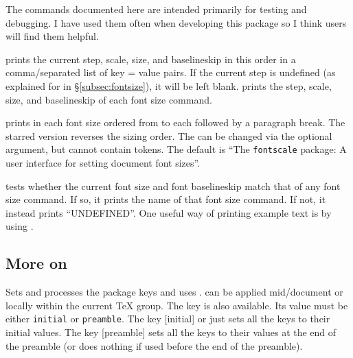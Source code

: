 \documentclass{beery}
\begin{document}
The commands documented here are intended primarily for testing and debugging.
I have used them often when developing this package so I think users will find them helpful.

\nopagebreak\newline
{}

 prints the current step, scale, size, and baselineskip in this order in a comma\-/separated list of key = value pairs.
If the current step is undefined (as explained for  in \S\ref{subsec:fontsize}), it will be left blank.
 prints the step, scale, size, and baselineskip of each font size command.

\nopagebreak\newline
{}

 prints  in each font size ordered from  to  each followed by a paragraph break.
The starred version  reverses the sizing order.
The  can be changed via the optional argument, but cannot contain  tokens.
The default  is \enquote{The \texttt{fontscale} package: A user interface for setting document font sizes}.

\KeepNextPar*

 tests whether the current font size and font baselineskip match that of any font size command.
If so, it prints the name of that font size command.
If not, it instead prints \enquote{UNDEFINED\@}.
One useful way of printing example text is by using
.

\subsection
  {%
    \texorpdfstring
      {More on }
      {More on \textbackslash{}fontscalesetup}%
  }
\label{subsec:fontscalesetup}

\KeepNextPar*

Sets and processes the  package keys and uses .
 can be applied mid\-/document or locally within the current \TeX{} group.
The key  is also available.
Its value must be either \texttt{initial} or \texttt{preamble}.
The key [initial] or just  sets all the keys to their initial values.
The key [preamble] sets all the keys to their values at the end of the preamble (or does nothing if used before the end of the preamble).
\end{document}
